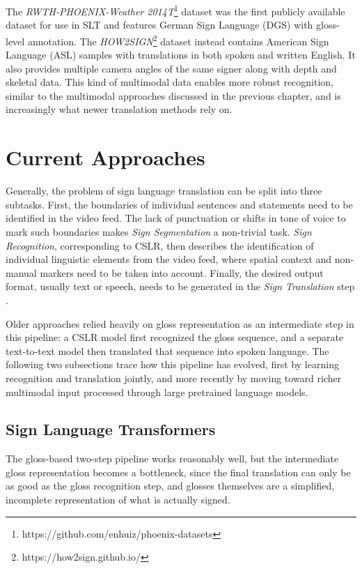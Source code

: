 The \textit{RWTH-PHOENIX-Weather 2014T}\footnote{https://github.com/enhuiz/phoenix-datasets} dataset was the first publicly available dataset for use in SLT and features German Sign Language (DGS) with gloss-level annotation. The \textit{HOW2SIGN}\footnote{https://how2sign.github.io/} dataset instead contains American Sign Language (ASL) samples with translations in both spoken and written English. It also provides multiple camera angles of the same signer along with depth and skeletal data. This kind of multimodal data enables more robust recognition, similar to the multimodal approaches discussed in the previous chapter, and is increasingly what newer translation methods rely on.
 
\section{Current Approaches}
Generally, the problem of sign language translation can be split into three subtasks. First, the boundaries of individual sentences and statements need to be identified in the video feed. The lack of punctuation or shifts in tone of voice to mark such boundaries makes \textit{Sign Segmentation} a non-trivial task. \textit{Sign Recognition}, corresponding to CSLR, then describes the identification of individual linguistic elements from the video feed, where spatial context and non-manual markers need to be taken into account. Finally, the desired output format, usually text or speech, needs to be generated in the \textit{Sign Translation} step \cite{cihancamgozSignLanguageTransformers2020}.
 
Older approaches relied heavily on gloss representation as an intermediate step in this pipeline: a CSLR model first recognized the gloss sequence, and a separate text-to-text model then translated that sequence into spoken language. The following two subsections trace how this pipeline has evolved, first by learning recognition and translation jointly, and more recently by moving toward richer multimodal input processed through large pretrained language models.
 
\subsection{Sign Language Transformers}
The gloss-based two-step pipeline works reasonably well, but the intermediate gloss representation becomes a bottleneck, since the final translation can only be as good as the gloss recognition step, and glosses themselves are a simplified, incomplete representation of what is actually signed.
 
